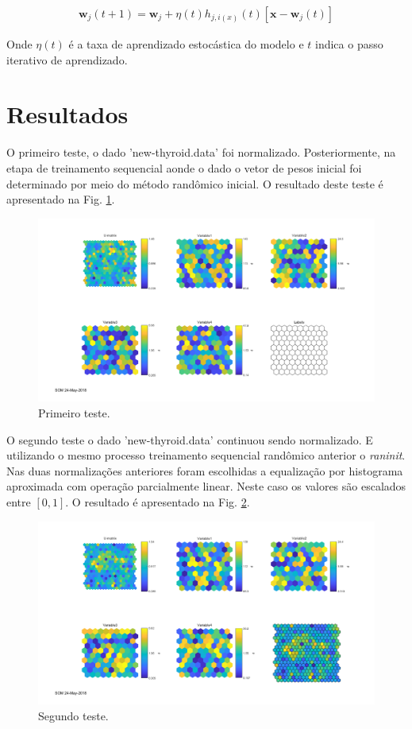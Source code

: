 \documentclass[journal, a4paper]{IEEEtran}
\begin{document}
\begin{eqnarray}
	\textbf{w}_{j}(t+1)= \textbf{w}_{j}+\eta(t)h_{j,i(x)}(t)[\textbf{x}-\textbf{w}_{j}(t)]
\end{eqnarray}

Onde $\eta(t)$ é a taxa de aprendizado estocástica do modelo e $t$ indica o passo iterativo de aprendizado.

\section{Resultados}

O primeiro teste, o dado 'new-thyroid.data' foi normalizado. Posteriormente, na etapa de treinamento sequencial aonde o dado o vetor de pesos inicial foi determinado por meio do método randômico inicial. O resultado deste teste é apresentado na Fig. \ref{SOM1}.

\begin{figure}[htb]
	\centering
	\includegraphics[scale=0.5]{Images/SOM1.png}
	\caption{Primeiro teste.}
	\label{SOM1}
\end{figure}

O segundo teste o dado 'new-thyroid.data' continuou sendo normalizado. E utilizando o mesmo processo treinamento sequencial randômico anterior o \textit{raninit}. Nas duas normalizações anteriores foram escolhidas a equalização por histograma aproximada com operação parcialmente linear. Neste caso os valores são escalados entre $[0,1]$. O resultado é apresentado na Fig. \ref{SOM2}.

\begin{figure}
	\centering
	\includegraphics[scale=0.5]{Images/SOM2.png}
	\caption{Segundo teste.}
	\label{SOM2}
\end{figure}
\end{document}
